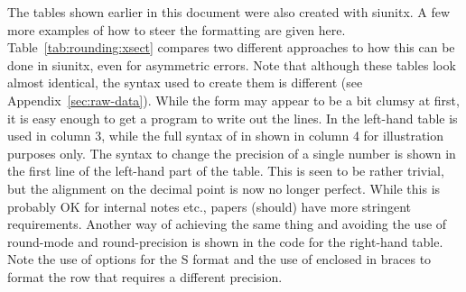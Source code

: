 \documentclass[UKenglish,texlive=2016]{\ATLASLATEXPATH atlasdoc}
\begin{document}
The tables shown earlier in this document were also created with \textsf{siunitx}.
A few more examples of how to steer the formatting are given here.
Table~\ref{tab:rounding:xsect} compares two different approaches
to how this can be done  in \textsf{siunitx}, even for asymmetric errors.  Note that although these
tables look almost identical, the syntax used to create them is different (see Appendix~\ref{sec:raw-data}).
While the form may appear to be a bit clumsy at first, it is easy enough to get a
program to write out the lines. In the left-hand table
 is used in column 3, while the full syntax of  
in shown in column 4 for illustration purposes only.  The syntax
to change the precision of a single number is shown in the first line of
the left-hand part of the table. This is seen to be rather
trivial, but the alignment on the decimal point is now no longer
perfect. While this is probably OK for internal notes etc., papers
(should) have more stringent requirements. Another way of achieving
the same thing and avoiding the use of \textsf{round-mode} and
\textsf{round-precision} is shown in the code for the right-hand table. Note the
use of options for the \textsf{S} format and the use of  enclosed
in braces to format the row that requires a different precision.
\end{document}
